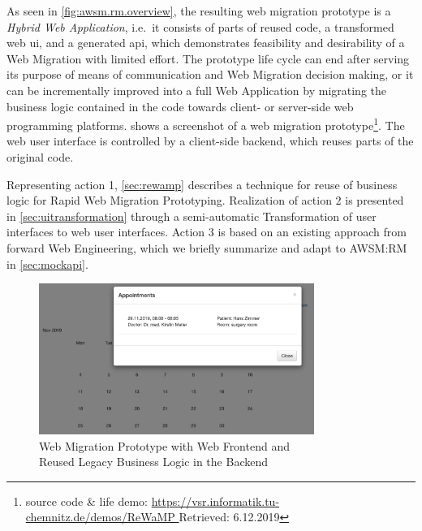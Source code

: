 As seen in \cref{fig:awsm.rm.overview}, the resulting \gls{web migration prototype} is a \emph{\gls{Hybrid Web Application}}, i.e.~it consists of parts of reused  code, a transformed \gls{web} \gls{ui}, and a generated  \gls{api}, which demonstrates feasibility and desirability of a \gls{Web Migration} with limited effort.
The prototype life cycle can end after serving its purpose of means of communication and \gls{Web Migration} decision making, or it can be incrementally improved into a full \gls{Web Application} by migrating the business logic contained in the  code towards client- or server-side \gls{web} programming platforms.
 shows a screenshot of a \gls{web migration prototype}\footnote{source code \& life demo: \url{https://vsr.informatik.tu-chemnitz.de/demos/ReWaMP
} Retrieved: 6.12.2019}.
The \gls{web} user interface is controlled by a client-side backend, which reuses parts of the original  code.

Representing action 1, \cref{sec:rewamp} describes a technique for reuse of business logic for \gls{Rapid Web Migration Prototyping}.
Realization of action 2 is presented in \cref{sec:uitransformation} through a semi-automatic \gls{Transformation} of  user interfaces to \gls{web} user interfaces.
Action 3 is based on an existing approach from forward \gls{Web Engineering}, which we briefly summarize and adapt to AWSM:RM in \cref{sec:mockapi}.

\begin{figure}[h!]
\hypertarget{fig:awsm.rm.prototype-screenshot}{%
\centering
\includegraphics[width=0.8\textwidth]{../figures/screenshots/rewamp-prototype.png}
\caption[Web Migration Prototype Screenshot]{Web Migration Prototype with Web Frontend and \\ Reused Legacy Business Logic in the Backend}\label{fig:awsm.rm.prototype-screenshot}
}
\end{figure}

